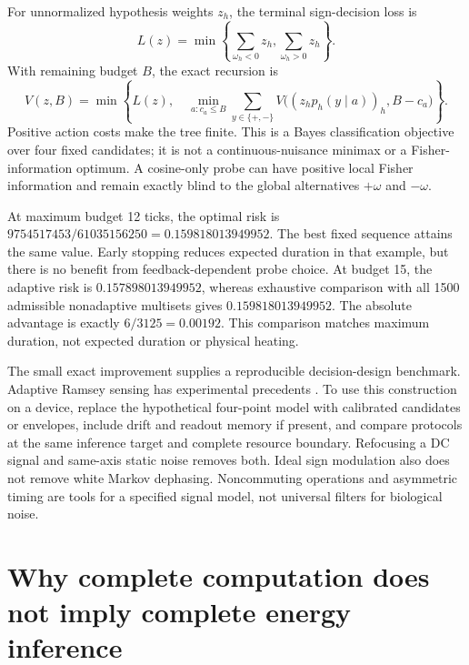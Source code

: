 For unnormalized hypothesis weights $z_h$, the terminal sign-decision loss is
\begin{equation}
 L(z)=\min\left\{\sum_{\omega_h<0}z_h,
                       \sum_{\omega_h>0}z_h\right\}.
\end{equation}
With remaining budget $B$, the exact recursion is
\begin{equation}
 V(z,B)=\min\left\{L(z),\quad
   \min_{a:c_a\leq B}\sum_{y\in\{+,-\}}
       V\big((z_hp_h(y\mid a))_h,B-c_a\big)\right\}.
 \label{eq:applications-ramsey-bellman}
\end{equation}
Positive action costs make the tree finite. This is a Bayes classification
objective over four fixed candidates; it is not a continuous-nuisance
minimax or a Fisher-information optimum. A cosine-only probe can have
positive local Fisher information and remain exactly blind to the global
alternatives $+\omega$ and $-\omega$.

At maximum budget 12 ticks, the optimal risk is
$9754517453/61035156250=0.159818013949952$. The best fixed sequence attains
the same value. Early stopping reduces expected duration in that example,
but there is no benefit from feedback-dependent probe choice. At budget
15, the adaptive risk is $0.157898013949952$, whereas exhaustive comparison
with all 1500 admissible nonadaptive multisets gives $0.159818013949952$.
The absolute advantage is exactly $6/3125=0.00192$. This comparison matches
maximum duration, not expected duration or physical heating.

The small exact improvement supplies a reproducible decision-design benchmark.
Adaptive Ramsey sensing has experimental precedents
\cite{physics-bonato,physics-delange}. To use this construction on a device,
replace the hypothetical four-point model with calibrated candidates or
envelopes, include drift and readout memory if present, and compare protocols
at the same inference target and complete resource boundary. Refocusing a
DC signal and same-axis static noise removes both. Ideal sign modulation
also does not remove white Markov dephasing. Noncommuting operations and
asymmetric timing are tools for a specified signal model, not universal
filters for biological noise.

\section[Hidden energy expenditure]{Why complete computation does not imply complete energy inference}
\label{sec:applications-energy}


